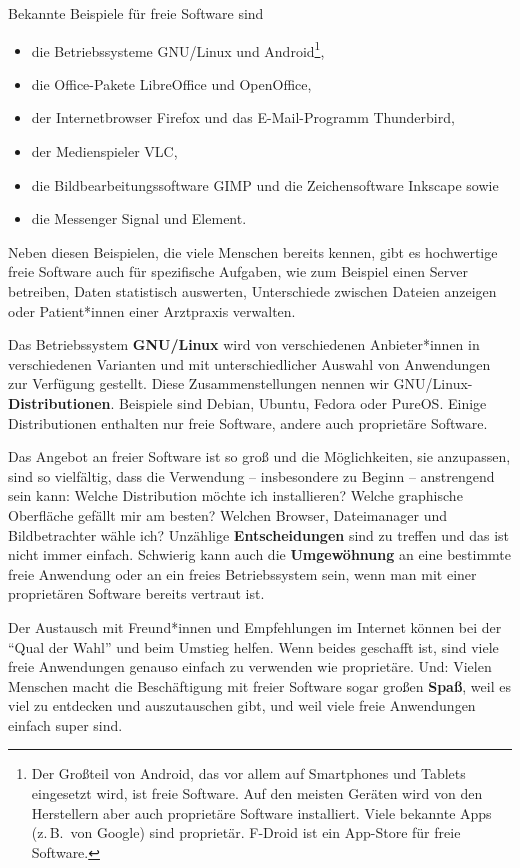 \documentclass[a5paper,12pt]{scrartcl}
\begin{document}
Bekannte Beispiele für freie Software sind
\begin{itemize}
\item die Betriebssysteme GNU/Linux und Android\footnote{Der Großteil
    von Android, das vor allem auf Smartphones und Tablets eingesetzt
    wird, ist freie Software. Auf den meisten Geräten wird von den
    Herstellern aber auch proprietäre Software installiert. Viele
    bekannte Apps (z.\,B.\ von Google) sind proprietär. F-Droid ist
    ein App-Store für freie Software.},
\item die Office-Pakete LibreOffice und OpenOffice,
\item der Internetbrowser Firefox und das E-Mail-Programm Thunderbird,
\item der Medienspieler VLC,
\item die Bildbearbeitungssoftware GIMP und die Zeichensoftware
  Inkscape sowie
\item die Messenger Signal und Element.
\end{itemize}

Neben diesen Beispielen, die viele Menschen bereits kennen, gibt es
hochwertige freie Software auch für spezifische Aufgaben, wie zum
Beispiel einen Server betreiben, Daten statistisch auswerten,
Unterschiede zwischen Dateien anzeigen oder Patient*innen einer
Arztpraxis verwalten.

Das Betriebssystem \textbf{GNU/Linux} wird von verschiedenen
Anbieter*innen in verschiedenen Varianten und mit unterschiedlicher
Auswahl von Anwendungen zur Verfügung gestellt. Diese
Zusammenstellungen nennen wir GNU/Linux-\textbf{Distributionen}.
Beispiele sind Debian, Ubuntu, Fedora oder PureOS. Einige
Distributionen enthalten nur freie Software, andere auch proprietäre
Software.

Das Angebot an freier Software ist so groß und die Möglichkeiten, sie
anzupassen, sind so vielfältig, dass die Verwendung -- insbesondere zu
Beginn -- anstrengend sein kann: Welche Distribution möchte ich
installieren? Welche graphische Oberfläche gefällt mir am besten?
Welchen Browser, Dateimanager und Bildbetrachter wähle ich? Unzählige
\textbf{Entscheidungen} sind zu treffen und das ist nicht immer
einfach. Schwierig kann auch die \textbf{Umgewöhnung} an eine
bestimmte freie Anwendung oder an ein freies Betriebssystem sein, wenn
man mit einer proprietären Software bereits vertraut ist.

Der Austausch mit Freund*innen und Empfehlungen im Internet können bei
der "`Qual der Wahl"' und beim Umstieg helfen. Wenn beides geschafft
ist, sind viele freie Anwendungen genauso einfach zu verwenden wie
proprietäre. Und: Vielen Menschen macht die Beschäftigung mit freier
Software sogar großen \textbf{Spaß}, weil es viel zu entdecken und
auszutauschen gibt, und weil viele freie Anwendungen einfach super
sind.
\end{document}
